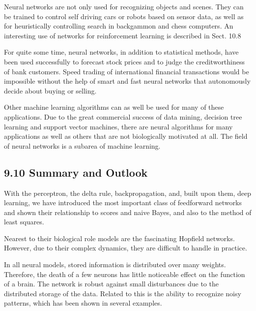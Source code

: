 \documentclass[10pt]{book}
\begin{document}
\begin{center}
\begin{enumerate}
\begin{center}
\begin{center}
\begin{center}
Neural networks are not only used for recognizing objects and scenes. They can be trained to control self driving cars or robots based on sensor data, as well as for heuristically controlling search in backgammon and chess computers. An interesting use of networks for reinforcement learning is described in Sect. 10.8

For quite some time, neural networks, in addition to statistical methods, have been used successfully to forecast stock prices and to judge the creditworthiness of bank customers. Speed trading of international financial transactions would be impossible without the help of smart and fast neural networks that autonomously decide about buying or selling.


Other machine learning algorithms can as well be used for many of these applications. Due to the great commercial success of data mining, decision tree learning and support vector machines, there are neural algorithms for many applications as well as others that are not biologically motivated at all. The field of neural networks is a subarea of machine learning.

\subsection*{9.10 Summary and Outlook}
With the perceptron, the delta rule, backpropagation, and, built upon them, deep learning, we have introduced the most important class of feedforward networks and shown their relationship to scores and naive Bayes, and also to the method of least squares.

Nearest to their biological role models are the fascinating Hopfield networks. However, due to their complex dynamics, they are difficult to handle in practice.

In all neural models, stored information is distributed over many weights. Therefore, the death of a few neurons has little noticeable effect on the function of a brain. The network is robust against small disturbances due to the distributed storage of the data. Related to this is the ability to recognize noisy patterns, which has been shown in several examples.


\end{center}
\end{center}
\end{center}
\end{enumerate}
\end{center}
\end{document}
